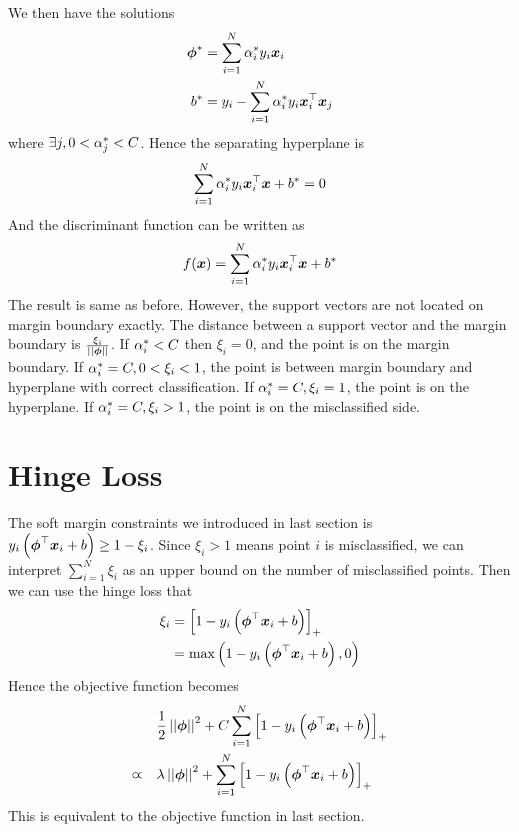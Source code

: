 We then have the solutions
\begin{align*}
	\boldsymbol{\phi}^*&=\sum_{i=1}^N\alpha_i^*y_i\boldsymbol{x}_i \\
	b^*&=y_i-\sum_{i=1}^N\alpha_i^*y_i\boldsymbol{x}_i^\top\boldsymbol{x}_j
\end{align*}
where $\exists j,0<\alpha_j^*<C$. Hence the separating hyperplane is
\begin{align*}
	\sum_{i=1}^N\alpha_i^*y_i\boldsymbol{x}_i^\top\boldsymbol{x}+b^*=0
\end{align*}
And the discriminant function can be written as
\begin{align*}
	f(\boldsymbol{x})=\sum_{i=1}^N\alpha_i^*y_i\boldsymbol{x}_i^\top\boldsymbol{x}+b^*
\end{align*}
The result is same as before. However, the support vectors are not located on margin boundary exactly. The distance between a support vector and the margin boundary is $\frac{\xi_i}{\left\vert\left\vert \boldsymbol{\phi} \right\vert\right\vert}$. If $\alpha_i^*<C$ then $\xi_i=0$, and the point is on the margin boundary. If $\alpha_i^*=C,0<\xi_i<1$, the point is between margin boundary and hyperplane with correct classification. If $\alpha_i^*=C,\xi_i=1$, the point is on the hyperplane. If $\alpha_i^*=C,\xi_i>1$, the point is on the misclassified side.



\section{Hinge Loss}
\label{section8.4}

The soft margin constraints we introduced in last section is $y_i\left(\boldsymbol{\phi}^\top\boldsymbol{x}_i+b\right)\geq 1-\xi_i$. Since $\xi_i>1$ means point $i$ is misclassified, we can interpret $\sum_{i=1}^N\xi_i$ as an upper bound on the number of misclassified points. Then we can use the hinge loss that 
\begin{align*}
	\xi_i&=\left[1-y_i\left(\boldsymbol{\phi}^\top\boldsymbol{x}_i+b\right)\right]_+ \\
	&=\max\left(1-y_i\left(\boldsymbol{\phi}^\top\boldsymbol{x}_i+b\right),0\right)
\end{align*}
Hence the objective function becomes
\begin{align*}
	&\frac{1}{2}\left\vert\left\vert \boldsymbol{\phi} \right\vert\right\vert^2+C\sum_{i=1}^N\left[1-y_i\left(\boldsymbol{\phi}^\top\boldsymbol{x}_i+b\right)\right]_+ \\
	\varpropto\quad&\lambda\left\vert\left\vert \boldsymbol{\phi} \right\vert\right\vert^2+\sum_{i=1}^N\left[1-y_i\left(\boldsymbol{\phi}^\top\boldsymbol{x}_i+b\right)\right]_+
\end{align*}
This is equivalent to the objective function in last section.



